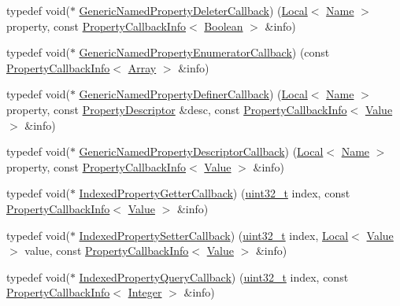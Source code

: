 \begin{DoxyCompactItemize}
\item 
typedef void($\ast$ \mbox{\hyperlink{namespacev8_ad2aecc0406ea4bc02d5a4f84a433b273}{Generic\+Named\+Property\+Deleter\+Callback}}) (\mbox{\hyperlink{classv8_1_1Local}{Local}}$<$ \mbox{\hyperlink{classv8_1_1Name}{Name}} $>$ property, const \mbox{\hyperlink{classv8_1_1PropertyCallbackInfo}{Property\+Callback\+Info}}$<$ \mbox{\hyperlink{classv8_1_1Boolean}{Boolean}} $>$ \&info)
\item 
typedef void($\ast$ \mbox{\hyperlink{namespacev8_a20826eb7e52e84fa4f632534e8eddd04}{Generic\+Named\+Property\+Enumerator\+Callback}}) (const \mbox{\hyperlink{classv8_1_1PropertyCallbackInfo}{Property\+Callback\+Info}}$<$ \mbox{\hyperlink{classv8_1_1Array}{Array}} $>$ \&info)
\item 
typedef void($\ast$ \mbox{\hyperlink{namespacev8_a66c854bc88d612ab4c65354bc0dc74a0}{Generic\+Named\+Property\+Definer\+Callback}}) (\mbox{\hyperlink{classv8_1_1Local}{Local}}$<$ \mbox{\hyperlink{classv8_1_1Name}{Name}} $>$ property, const \mbox{\hyperlink{classv8_1_1PropertyDescriptor}{Property\+Descriptor}} \&desc, const \mbox{\hyperlink{classv8_1_1PropertyCallbackInfo}{Property\+Callback\+Info}}$<$ \mbox{\hyperlink{classv8_1_1Value}{Value}} $>$ \&info)
\item 
typedef void($\ast$ \mbox{\hyperlink{namespacev8_a8cf8faa26baffa84173a24906c0d49f6}{Generic\+Named\+Property\+Descriptor\+Callback}}) (\mbox{\hyperlink{classv8_1_1Local}{Local}}$<$ \mbox{\hyperlink{classv8_1_1Name}{Name}} $>$ property, const \mbox{\hyperlink{classv8_1_1PropertyCallbackInfo}{Property\+Callback\+Info}}$<$ \mbox{\hyperlink{classv8_1_1Value}{Value}} $>$ \&info)
\item 
typedef void($\ast$ \mbox{\hyperlink{namespacev8_a48e7816ba64447bf32a25d194588daaf}{Indexed\+Property\+Getter\+Callback}}) (\mbox{\hyperlink{classuint32__t}{uint32\+\_\+t}} index, const \mbox{\hyperlink{classv8_1_1PropertyCallbackInfo}{Property\+Callback\+Info}}$<$ \mbox{\hyperlink{classv8_1_1Value}{Value}} $>$ \&info)
\item 
typedef void($\ast$ \mbox{\hyperlink{namespacev8_a4ac7cc6185ebc8b6a199f9fa8e6bf5c3}{Indexed\+Property\+Setter\+Callback}}) (\mbox{\hyperlink{classuint32__t}{uint32\+\_\+t}} index, \mbox{\hyperlink{classv8_1_1Local}{Local}}$<$ \mbox{\hyperlink{classv8_1_1Value}{Value}} $>$ value, const \mbox{\hyperlink{classv8_1_1PropertyCallbackInfo}{Property\+Callback\+Info}}$<$ \mbox{\hyperlink{classv8_1_1Value}{Value}} $>$ \&info)
\item 
typedef void($\ast$ \mbox{\hyperlink{namespacev8_a980b62c33eb664783e61e25c3b27f9ee}{Indexed\+Property\+Query\+Callback}}) (\mbox{\hyperlink{classuint32__t}{uint32\+\_\+t}} index, const \mbox{\hyperlink{classv8_1_1PropertyCallbackInfo}{Property\+Callback\+Info}}$<$ \mbox{\hyperlink{classv8_1_1Integer}{Integer}} $>$ \&info)

\end{DoxyCompactItemize}
